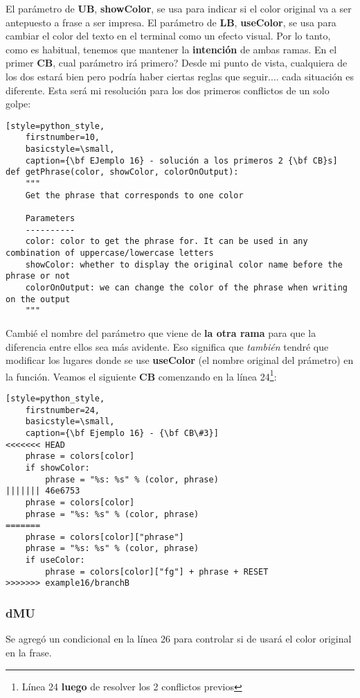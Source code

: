 El parámetro de {\bf UB}, {\bf showColor}, se usa para indicar si el color original va a ser antepuesto a frase a ser impresa. El
parámetro de {\bf LB}, {\bf useColor}, se usa para cambiar el color del texto en el terminal como un efecto visual. Por lo tanto, como
es habitual, tenemos que mantener la {\bf intención} de ambas ramas. En el primer {\bf CB}, cual parámetro irá primero?
Desde mi punto de vista, cualquiera de los dos estará bien pero podría haber ciertas reglas que seguir.... cada situación es diferente.
Esta será mi resolución para los dos primeros conflictos de un solo golpe:

\begin{lstlisting}[style=python_style,
	firstnumber=10,
	basicstyle=\small,
	caption={\bf EJemplo 16} - solución a los primeros 2 {\bf CB}s]
def getPhrase(color, showColor, colorOnOutput):
    """
    Get the phrase that corresponds to one color
    
    Parameters
    ----------
    color: color to get the phrase for. It can be used in any combination of uppercase/lowercase letters
    showColor: whether to display the original color name before the phrase or not
    colorOnOutput: we can change the color of the phrase when writing on the output
    """
\end{lstlisting}

Cambié el nombre del parámetro que viene de {\bf la otra rama} para que la diferencia entre ellos sea más avidente. Eso significa que
{\it también} tendré que modificar los lugares donde se use {\bf useColor} (el nombre original del prámetro) en la función.
Veamos el siguiente {\bf CB} comenzando en la línea 24\footnote{Línea 24 {\bf luego} de resolver los 2 conflictos previos}:

\begin{lstlisting}[style=python_style,
	firstnumber=24,
	basicstyle=\small,
	caption={\bf Ejemplo 16} - {\bf CB\#3}]
<<<<<<< HEAD
    phrase = colors[color]
    if showColor:
        phrase = "%s: %s" % (color, phrase)
||||||| 46e6753
    phrase = colors[color]
    phrase = "%s: %s" % (color, phrase)
=======
    phrase = colors[color]["phrase"]
    phrase = "%s: %s" % (color, phrase)
    if useColor:
        phrase = colors[color]["fg"] + phrase + RESET
>>>>>>> example16/branchB
\end{lstlisting}

\subsubsection{dMU}
Se agregó un condicional en la línea 26 para controlar si de usará el color original en la frase.

